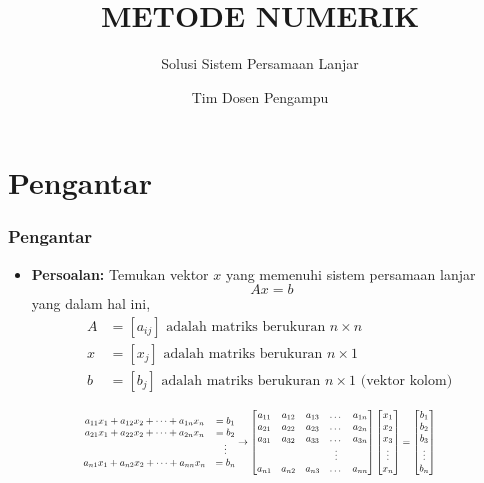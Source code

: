 \documentclass[pdflatex,compress,mathserif]{beamer}
\title{METODE NUMERIK}
\subtitle{Solusi Sistem Persamaan Lanjar}
\author{Tim Dosen Pengampu}
\newcommand*{\Scale}[2][4]{\scalebox{#1}{$#2$}}%
\begin{document}
	
\maketitle

\section{Pengantar}

\begin{frame}
	\frametitle{Pengantar}
	\begin{itemize}
		\item \textbf{Persoalan:} Temukan vektor $ x $ yang memenuhi sistem persamaan lanjar \[ Ax = b \] yang dalam hal ini,
		\begin{align*}
			A &= [a_{ij}] \text{ adalah matriks berukuran } n \times n\\
			x &= [x_{j}]  \text{ adalah matriks berukuran } n \times 1 \\
			b &= [b_{j}]  \text{ adalah matriks berukuran } n \times 1 \text{ (vektor kolom) }
		\end{align*}
	\end{itemize}
	\[\Scale[0.7]{
		\begin{matrix}
			a_{11}x_1 + a_{12}x_2 + \dots + a_{1n}x_n &= b_1 \\
			a_{21}x_1 + a_{22}x_2 + \dots + a_{2n}x_n &= b_2 \\
			&\vdots\\
			a_{n1}x_1 + a_{n2}x_2 + \dots + a_{nn}x_n &= b_n
		\end{matrix}
		\rightarrow
		\begin{bmatrix}
			a_{11} & a_{12} & a_{13} & \dots & a_{1n} \\
			a_{21} & a_{22} & a_{23} & \dots & a_{2n} \\
			a_{31} & a_{32} & a_{33} & \dots & a_{3n} \\
			& & & \vdots &  \\
			a_{n1} & a_{n2} & a_{n3} & \dots & a_{nn}
		\end{bmatrix}
		\begin{bmatrix}
			x_1 \\
			x_2 \\
			x_3 \\
			\vdots\\
			x_n \\
		\end{bmatrix}
		=
		\begin{bmatrix}
			b_1 \\
			b_2 \\
			b_3 \\
			\vdots\\
			b_n \\
		\end{bmatrix}
	}\]
\end{frame}
\end{document}
